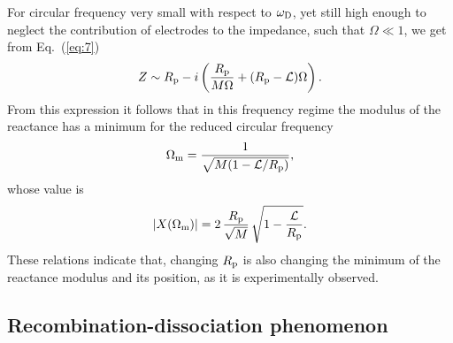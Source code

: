 \documentclass[preprint,aps,pre]{revtex4}
\begin{document}
For circular frequency very small with respect to $\omega_{\rm D}$, yet still high enough to neglect the contribution of electrodes to the impedance, such that $\Omega\ll 1$, we get from Eq.~(\ref{eq:7})
\begin{equation}
\label{eq:8} Z\sim R_{\rm p}-i\left(\frac{R_{\rm p}}{M \Omega}+(R_{\rm p}-{\cal L})\Omega\right).
\end{equation}
From this expression it follows that in this frequency regime the modulus of the reactance has a minimum for the reduced circular frequency
\begin{equation}
\label{eq:9} \Omega_{\rm m}=\frac{1}{\sqrt{M(1-{\cal L}/R_{\rm p})}},
\end{equation}
whose value is
\begin{equation}
\label{eq:10} |X(\Omega_{\rm m})|=2\,\frac{R_{\rm p}}{\sqrt{M}}\,\sqrt{1-\frac{{\cal L}}{R_{\rm p}}}.
\end{equation}
These relations indicate that, changing $R_{\rm p}$ is also changing the minimum of the reactance modulus and its position, as it is experimentally observed.

\subsection{Recombination-dissociation phenomenon}
\label{subsec:2b}
\end{document}
